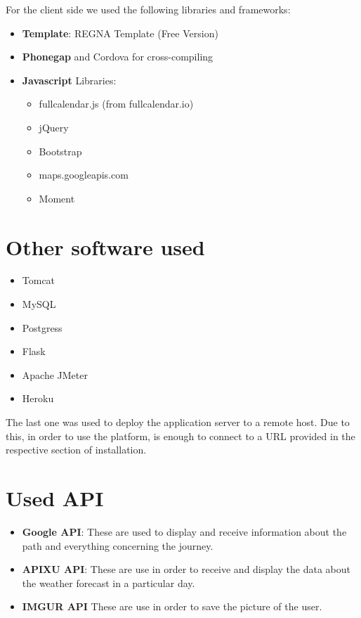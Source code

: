 \documentclass[numbers=noenddot, 12pt, a4paper, oneside]{scrbook}
\begin{document}
For the client side we used the following libraries and frameworks:
\begin{itemize}
	\item \textbf{Template}: REGNA Template (Free Version)
	\item \textbf{Phonegap} and Cordova for cross-compiling
	\item \textbf{Javascript} Libraries:
	\begin{itemize}
		\item fullcalendar.js (from fullcalendar.io)
		\item jQuery
		\item Bootstrap
		\item maps.googleapis.com
		\item Moment
	\end{itemize}	
\end{itemize}

\section*{Other software used}

\begin{itemize}
	\item Tomcat
	\item MySQL
	\item Postgress
	\item Flask
	\item Apache JMeter
	\item Heroku
\end{itemize}

The last one was used to deploy the application server to a remote host. Due to this, in order to use the platform, is enough to connect to a URL provided in the respective section of installation. 

\section*{Used API}

\begin{itemize}
	\item \textbf{Google API}: These are used to display and receive information about the path and everything concerning the journey.
	
	\item \textbf{APIXU API}: These are use in order to receive and display the data about the weather forecast in a particular day.
	
	\item \textbf{IMGUR API} These are use in order to save the picture of the user.
\end{itemize}
\end{document}
